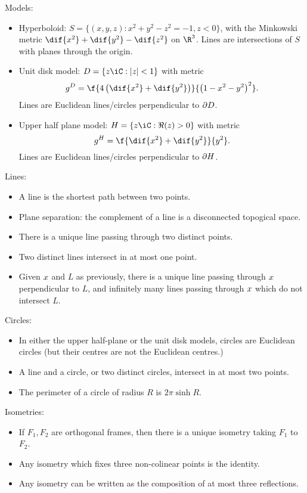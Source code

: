 Models:
\begin{itemize}
	\shortskip
	\item Hyperboloid: %
	$S = \{(x,y,z): x^2+y^2-z^2=-1, z<0\}$, with the Minkowski metric $\dif{x^2} + \dif{y^2} - \dif{z^2}$ on $\R^3$. Lines are intersections of $S$ with planes through the origin.
	\item Unit disk model: $D = \left\{z \iC: \left\vert z \right\vert < 1\right\}$ with metric
	\begin{equation*}
		g^D = \f{4\left( \dif{x^2} + \dif{y^2} \right)}{\left( 1-x^2-y^2 \right)^2}.
	\end{equation*}
	Lines are Euclidean lines/circles perpendicular to $\partial{D}$.
	\item Upper half plane model: $H = \left\{z \iC: \Re (z)>0\right\}$ with metric
	\begin{equation*}
		g^H = \f{\dif{x^2} + \dif{y^2}}{y^2}.
	\end{equation*}
	Lines are Euclidean lines/circles perpendicular to $\partial{H}$.
\end{itemize}

Lines:
\begin{itemize}
	\shortskip
	\item A line is the shortest path between two points.
	\item Plane separation: the complement of a line is a disconnected topogical space.
	\item There is a unique line passing through two distinct points.
	\item Two distinct lines intersect in at most one point.
	\item Given $x$ and $L$ as previously, there is a unique line passing through $x$ perpendicular to $L$, and infinitely many lines passing through $x$ which do not intersect $L$.
\end{itemize}

Circles:
\begin{itemize}
	\shortskip
	\item In either the upper half-plane or the unit disk models, circles are Euclidean circles (but their centres are not the Euclidean centres.)
	\item A line and a circle, or two distinct circles, intersect in at most two points.
	\item The perimeter of a circle of radius $R$ is $2\pi\sinh R$.
\end{itemize}

Isometries:
\begin{itemize}
	\shortskip
	\item If $F_1, F_2$ are orthogonal frames, then there is a unique isometry taking $F_1$ to $F_2$.
	\item Any isometry which fixes three non-colinear points is the identity.
	\item Any isometry can be written as the composition of at most three reflections.
\end{itemize}

